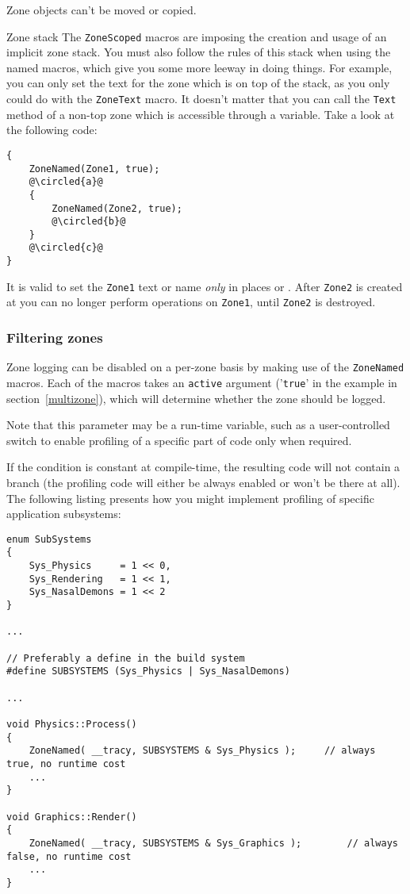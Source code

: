 \documentclass[hidelinks,titlepage,a4paper,twoside]{article}
\newcommand*\circled[1]{\tikz[baseline=(char.base)]{
    \node[shape=circle,draw,inner sep=1.5pt] (char) {#1};}}
\begin{document}
Zone objects can't be moved or copied.

\begin{bclogo}[
noborder=true,
couleur=black!5,
logo=\bcattention
]{Zone stack}
The \texttt{ZoneScoped} macros are imposing the creation and usage of an implicit zone stack. You must also follow the rules of this stack when using the named macros, which give you some more leeway in doing things. For example, you can only set the text for the zone which is on top of the stack, as you only could do with the \texttt{ZoneText} macro. It doesn't matter that you can call the \texttt{Text} method of a non-top zone which is accessible through a variable. Take a look at the following code:

\begin{lstlisting}
{
	ZoneNamed(Zone1, true);
	@\circled{a}@
	{
		ZoneNamed(Zone2, true);
		@\circled{b}@
	}
	@\circled{c}@
}
\end{lstlisting}

It is valid to set the \texttt{Zone1} text or name \emph{only} in places \circled{a} or \circled{c}. After \texttt{Zone2} is created at \circled{b} you can no longer perform operations on \texttt{Zone1}, until \texttt{Zone2} is destroyed.
\end{bclogo}

\subsubsection{Filtering zones}
\label{filteringzones}

Zone logging can be disabled on a per-zone basis by making use of the \texttt{ZoneNamed} macros. Each of the macros takes an \texttt{active} argument ('\texttt{true}' in the example in section~\ref{multizone}), which will determine whether the zone should be logged.

Note that this parameter may be a run-time variable, such as a user-controlled switch to enable profiling of a specific part of code only when required.

If the condition is constant at compile-time, the resulting code will not contain a branch (the profiling code will either be always enabled or won't be there at all). The following listing presents how you might implement profiling of specific application subsystems:

\begin{lstlisting}
enum SubSystems
{
	Sys_Physics		= 1 << 0,
	Sys_Rendering	= 1 << 1,
	Sys_NasalDemons	= 1 << 2
}

...

// Preferably a define in the build system
#define SUBSYSTEMS (Sys_Physics | Sys_NasalDemons)

...

void Physics::Process()
{
	ZoneNamed( __tracy, SUBSYSTEMS & Sys_Physics );		// always true, no runtime cost
	...
}

void Graphics::Render()
{
	ZoneNamed( __tracy, SUBSYSTEMS & Sys_Graphics );		// always false, no runtime cost
	...
}
\end{lstlisting}
\end{document}
